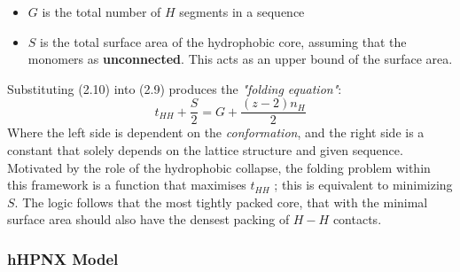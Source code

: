 \begin{itemize}
    \item $G$ is the total number of $H$ segments in a sequence
    \item $S$ is the total surface area of the hydrophobic core, assuming that
        the monomers as \textbf{unconnected}. This acts as an upper bound of the surface
        area.
\end{itemize}

Substituting (2.10) into (2.9) produces the \emph{"folding equation"}:
\begin{equation}
    t_{HH} + \frac{S}{2} = G + \frac{(z-2)n_H}{2}
\end{equation}
Where the left side is dependent on the \emph{conformation}, and the right
side is a constant that solely depends on the lattice structure and given sequence.
Motivated by the role of the hydrophobic collapse, the folding problem within this
framework is a function that maximises $t_{HH}$ ; this is equivalent to
minimizing $S$. The logic follows that the most tightly packed core, that with the minimal
surface area should also have the densest packing of $H-H$ contacts. \\
\subsubsection{hHPNX Model}
